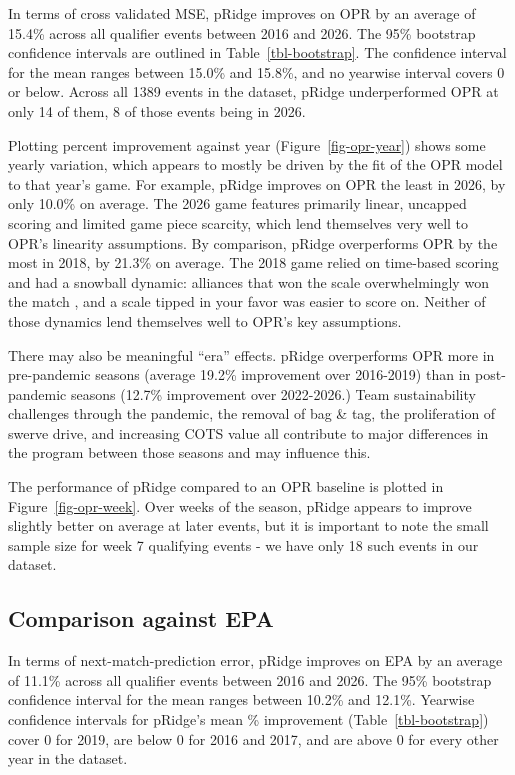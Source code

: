 \documentclass[
  12pt]{article}
\begin{document}
In terms of cross validated MSE, pRidge improves on OPR by an average of
15.4\% across all qualifier events between 2016 and 2026. The 95\%
bootstrap confidence intervals are outlined in
Table~\ref{tbl-bootstrap}. The confidence interval for the mean ranges
between 15.0\% and 15.8\%, and no yearwise interval covers 0 or below.
Across all 1389 events in the dataset, pRidge underperformed OPR at only
14 of them, 8 of those events being in 2026.

Plotting percent improvement against year (Figure~\ref{fig-opr-year})
shows some yearly variation, which appears to mostly be driven by the
fit of the OPR model to that year's game. For example, pRidge improves
on OPR the least in 2026, by only 10.0\% on average. The 2026 game
features primarily linear, uncapped scoring and limited game piece
scarcity, which lend themselves very well to OPR's linearity
assumptions. By comparison, pRidge overperforms OPR by the most in 2018,
by 21.3\% on average. The 2018 game relied on time-based scoring and had
a snowball dynamic: alliances that won the scale overwhelmingly won the
match \citep{powerup_blog}, and a scale tipped in your favor was easier
to score on. Neither of those dynamics lend themselves well to OPR's key
assumptions.

There may also be meaningful ``era'' effects. pRidge overperforms OPR
more in pre-pandemic seasons (average 19.2\% improvement over 2016-2019)
than in post-pandemic seasons (12.7\% improvement over 2022-2026.) Team
sustainability challenges through the pandemic, the removal of bag \&
tag, the proliferation of swerve drive, and increasing COTS value all
contribute to major differences in the program between those seasons and
may influence this.

The performance of pRidge compared to an OPR baseline is plotted in
Figure~\ref{fig-opr-week}. Over weeks of the season, pRidge appears to
improve slightly better on average at later events, but it is important
to note the small sample size for week 7 qualifying events - we have
only 18 such events in our dataset.

\subsection{Comparison against EPA}\label{comparison-against-epa}

In terms of next-match-prediction error, pRidge improves on EPA by an
average of 11.1\% across all qualifier events between 2016 and 2026. The
95\% bootstrap confidence interval for the mean ranges between 10.2\%
and 12.1\%. Yearwise confidence intervals for pRidge's mean \%
improvement (Table~\ref{tbl-bootstrap}) cover 0 for 2019, are below 0
for 2016 and 2017, and are above 0 for every other year in the dataset.
\end{document}
